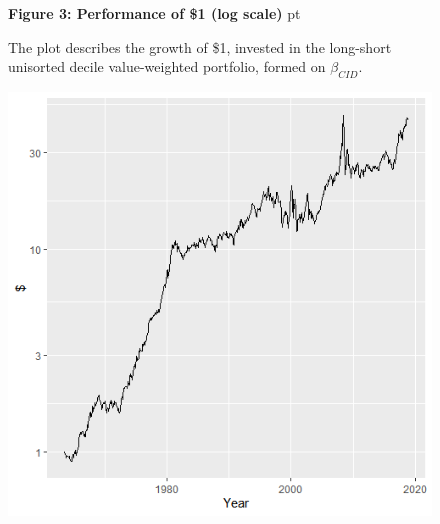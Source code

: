 \documentclass[12pt]{article}
\begin{document}
\begin{figure}
\textbf{Figure 3: Performance of \$1 (log scale)}
 pt
\begin{flushleft}
{The plot describes the growth of \$1, invested in the long-short unisorted decile value-weighted portfolio, formed on $\beta_{CID}$.}
\end{flushleft}
\centering
\includegraphics[width=1\textwidth]{paper_b3/Figure3.png}
\end{figure}
\end{document}
